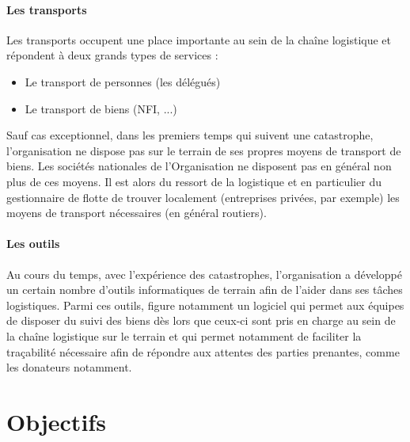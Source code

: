 \paragraph{Les transports}
Les transports occupent une place importante au sein de la chaîne logistique et répondent à deux grands types de services :
\begin{itemize}
\item Le transport de personnes (les délégués)
\item Le transport de biens (NFI, ...)
\end{itemize}
Sauf cas exceptionnel, dans les premiers temps qui suivent une catastrophe, l'organisation ne dispose pas sur le terrain de ses propres moyens de transport de biens. Les sociétés nationales de l'Organisation ne disposent pas en général non plus de ces moyens. Il est alors du ressort de la logistique et en particulier du gestionnaire de flotte de trouver localement (entreprises privées, par exemple) les moyens de transport nécessaires (en général routiers).

\paragraph{Les outils}
Au cours du temps, avec l'expérience des catastrophes, l'organisation a développé un certain nombre d'outils informatiques de terrain afin de l'aider dans ses tâches logistiques. Parmi ces outils, figure notamment un logiciel qui permet aux équipes de disposer du suivi des biens dès lors que ceux-ci sont pris en charge au sein de la chaîne logistique sur le terrain et qui permet notamment de faciliter la traçabilité nécessaire afin de répondre aux attentes des parties prenantes, comme les donateurs notamment.


\section{Objectifs}
